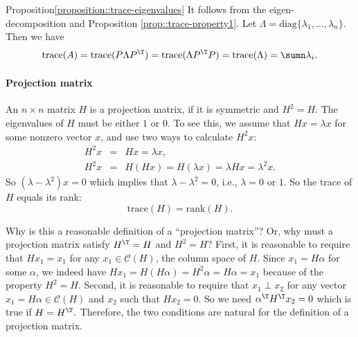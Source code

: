 \begin{myproof}{Proposition}{\ref{proposition::trace-eigenvalues}}
It follows from the eigen-decomposition and Proposition \ref{prop::trace-property1}. Let $\Lambda=\text{diag}\{\lambda_{1},\ldots,\lambda_{n}\}$. Then we have
$$
\text{trace}(A)  =\text{trace}(P\Lambda P^{\T})
  =\text{trace}(\Lambda P^{\T}P)
  =\text{trace}(\Lambda)
  =\sumn\lambda_{i}.
$$
\end{myproof}


\paragraph*{Projection matrix}

An $n\times n$ matrix $H$ is a projection matrix, if it is symmetric and $H^{2}=H.$ The eigenvalues of $H$ must be either $1$ or $0$. To see this, we assume that $H x = \lambda x$ for some nonzero vector $x$, and use two ways to calculate $H^2x$:
\begin{eqnarray*}
H^2x &=& Hx = \lambda x,\\ 
H^2x &=& H(Hx) = H(\lambda x ) = \lambda Hx =  \lambda^2 x.
\end{eqnarray*}
So $ (\lambda - \lambda^2) x = 0$ which implies that $\lambda - \lambda^2=0$, i.e., $\lambda = 0$ or $1$. 
%
So the trace of
$H$ equals its rank:
\[
\text{trace}(H)=\text{rank}(H).
\]

Why is this a reasonable definition of a ``projection matrix''? Or, why must a projection matrix
satisfy $H^{\T}=H$ and $H^{2}=H$? First, it is reasonable
to require that $Hx_{1}=x_{1}$ for any $x_{1} \in \mathcal{C}(H)$,
the column space of $H.$ Since $x_{1}=H\alpha$ for some $\alpha$,
we indeed have $Hx_{1}=H(H\alpha)=H^{2}\alpha=H\alpha=x_{1}$ because
of the property $H^{2}=H$. Second, it is reasonable to require that $x_{1}\perp x_{2}$
for any vector $x_{1}=H\alpha \in\mathcal{C}(H)$ and $x_{2}$ such that $Hx_{2}=0$.
So we need $\alpha^{\T}H^{\T}x_{2}=0$ which is true if $H=H^{\T}.$
Therefore, the two conditions are natural for the definition of a
projection matrix. 


